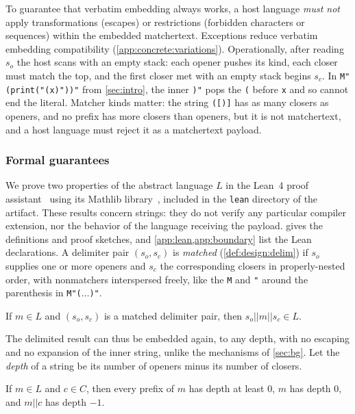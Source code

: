 To guarantee that verbatim embedding always works,
a host language \emph{must not} apply
transformations (\eg escapes)
or restrictions (\eg forbidden characters or sequences)
within the embedded matchertext.
Exceptions reduce verbatim embedding compatibility
(\cref{app:concrete:variations}).
Operationally, after reading $s_o$ the host scans with an empty stack:
each opener pushes its kind, each closer must match the top,
and the first closer met with an empty stack begins $s_c$.
In \verb|M"(print("(x)"))"| from \cref{sec:intro},
the inner \verb|)"| pops the \verb|(| before \verb|x|
and so cannot end the literal.
Matcher kinds matter:
the string \verb|([)]| has as many closers as openers,
and no prefix has more closers than openers,
but it is not matchertext,
and a host language must reject it as a matchertext payload.


\subsubsection{Formal guarantees}
\label{sec:design:abstract:formal}

We prove two properties of the abstract language $L$
in the Lean~4 proof assistant~\cite{demoura21lean4}
using its Mathlib library~\cite{mathlib20},
included in the \texttt{lean} directory of the artifact.
These results concern strings:
they do not verify any particular compiler extension,
nor the behavior of the language receiving the payload.
 gives the definitions and proof sketches,
and \cref{app:lean,app:boundary} list the Lean declarations.
A delimiter pair $(s_o,s_c)$ is \emph{matched}
(\cref{def:design:delim})
if $s_o$ supplies one or more openers
and $s_c$ the corresponding closers in properly-nested order,
with nonmatchers interspersed freely,
like the \texttt{M} and \texttt{"} around the parenthesis
in \verb|M"(|$\dots$\verb|)"|.

\begin{theorem}
\label{thm:design:embed}
If $m \in L$ and $(s_o,s_c)$ is a matched delimiter pair,
then $s_o||m||s_c \in L$.
\end{theorem}

The delimited result can thus be embedded again, to any depth,
with no escaping and no expansion of the inner string,
unlike the mechanisms of \cref{sec:bg}.
Let the \emph{depth} of a string be its number of openers
minus its number of closers.

\begin{theorem}
\label{thm:design:findend}
If $m \in L$ and $c \in C$,
then every prefix of $m$ has depth at least $0$,
$m$ has depth $0$, and $m||c$ has depth $-1$.
\end{theorem}


